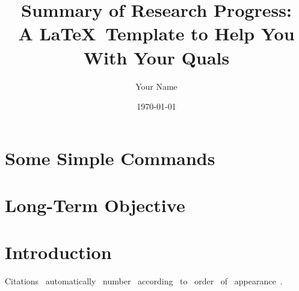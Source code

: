\documentclass{report}
\title{Summary of Research Progress:\\A \LaTeX\ Template to Help You With Your Quals}
\author{Your Name}
\date{\today}
\begin{document}
\maketitle


\thispagestyle{fancy}


\section{Some Simple Commands}



\section{Long-Term Objective}
\label{sec:objective}


\section{Introduction}
\label{sec:introduction}
Citations~\cite{youssef_scalable_2021} automatically~\cite{sood_coupling_2022} number~\cite{schuette_decorrelating_2023} according~\cite{schuette_applying_2020} to~\cite{youssef_scalable_2023} order~\cite{schuette_efficient_2023} of~\cite{zhang_topology_2015} appearance~\cite{zhang_shape_2016}.




\end{document}

